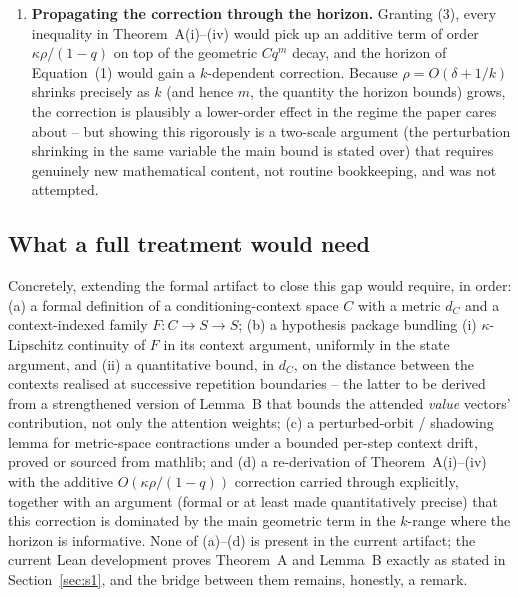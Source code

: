 \documentclass[11pt]{article}
\begin{document}
\begin{enumerate}
  form for this setting, and instantiating or proving it was out of scope for
  this artifact.
\item \textbf{Propagating the correction through the horizon.} Granting (3),
  every inequality in Theorem~A(i)--(iv) would pick up an additive term of
  order $\kappa\rho/(1-q)$ on top of the geometric $Cq^m$ decay, and the
  horizon of Equation~(1) would gain a $k$-dependent correction. Because
  $\rho = O(\delta+1/k)$ shrinks precisely as $k$ (and hence $m$, the quantity
  the horizon bounds) grows, the correction is plausibly a lower-order effect
  in the regime the paper cares about -- but showing this rigorously is a
  two-scale argument (the perturbation shrinking in the same variable the
  main bound is stated over) that requires genuinely new mathematical content,
  not routine bookkeeping, and was not attempted.
\end{enumerate}

\subsection{What a full treatment would need}

Concretely, extending the formal artifact to close this gap would require, in
order: (a) a formal definition of a conditioning-context space $C$ with a
metric $d_C$ and a context-indexed family $F : C \to S \to S$; (b) a
hypothesis package bundling (i) $\kappa$-Lipschitz continuity of $F$ in its
context argument, uniformly in the state argument, and (ii) a quantitative
bound, in $d_C$, on the distance between the contexts realised at successive
repetition boundaries -- the latter to be derived from a strengthened version
of Lemma~B that bounds the attended \emph{value} vectors' contribution, not
only the attention weights; (c) a perturbed-orbit / shadowing lemma for
metric-space contractions under a bounded per-step context drift, proved or
sourced from mathlib; and (d) a re-derivation of Theorem~A(i)--(iv) with the
additive $O(\kappa\rho/(1-q))$ correction carried through explicitly, together
with an argument (formal or at least made quantitatively precise) that this
correction is dominated by the main geometric term in the $k$-range where the
horizon is informative. None of (a)--(d) is present in the current artifact;
the current Lean development proves Theorem~A and Lemma~B exactly as stated
in Section~\ref{sec:s1}, and the bridge between them remains, honestly, a
remark.

\end{document}

